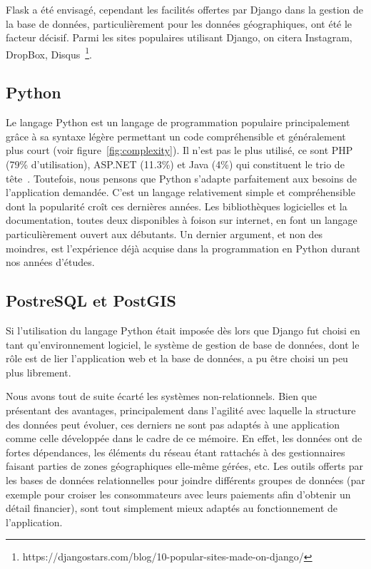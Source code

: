 \documentclass{EPL-master-thesis-covers-FR}
\begin{document}
					Flask a été envisagé, cependant les facilités offertes par Django dans la gestion de la base de données, particulièrement pour les données géographiques, ont été le facteur décisif. Parmi les sites populaires utilisant Django, on citera Instagram, DropBox, Disqus~\footnote{https://djangostars.com/blog/10-popular-sites-made-on-django/}.

			\subsection*{Python}
				Le langage Python est un langage de programmation populaire principalement grâce à sa syntaxe légère permettant un code compréhensible et généralement plus court (voir figure~\ref{fig:complexity}). Il n'est pas le plus utilisé, ce sont PHP (79\% d'utilisation), ASP.NET (11.3\%) et Java (4\%) qui constituent le trio de tête~\cite{ref:popular_programming_languages}. Toutefois, nous pensons que Python s'adapte parfaitement aux besoins de l'application demandée. C'est un langage relativement simple et compréhensible dont la popularité croît ces dernières années. Les bibliothèques logicielles et la documentation, toutes deux disponibles à foison sur internet, en font un langage particulièrement ouvert aux débutants. Un dernier argument, et non des moindres, est l'expérience déjà acquise dans la programmation en Python durant nos années d'études.

			\subsection*{PostreSQL et PostGIS}

				Si l'utilisation du langage Python était imposée dès lors que Django fut choisi en tant qu'environnement logiciel, le système de gestion de base de données, dont le rôle est de lier l'application web et la base de données, a pu être choisi un peu plus librement.

				Nous avons tout de suite écarté les systèmes non-relationnels. Bien que présentant des avantages, principalement dans l'agilité avec laquelle la structure des données peut évoluer, ces derniers ne sont pas adaptés à une application comme celle développée dans le cadre de ce mémoire. En effet, les données ont de fortes dépendances, les éléments du réseau étant rattachés à des gestionnaires faisant parties de zones géographiques elle-même gérées, etc. Les outils offerts par les bases de données relationnelles pour joindre différents groupes de données (par exemple pour croiser les consommateurs avec leurs paiements afin d'obtenir un détail financier), sont tout simplement mieux adaptés au fonctionnement de l'application.
\end{document}
